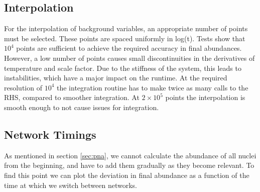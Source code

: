 \subsection{Interpolation}
\label{sec:interpolation}
For the interpolation of background variables, an appropriate number of points must be selected. These points are spaced uniformly in log(t). Tests show that $10^4$ points are sufficient to achieve the required accuracy in final abundances. However, a low number of points causes small discontinuities in the derivatives of temperature and scale factor. Due to the stiffness of the system, this leads to instabilities, which have a major impact on the runtime. At the required resolution of $10^4$ the integration routine has to make twice as many calls to the RHS, compared to smoother integration. At $2\times 10^5$ points the interpolation is smooth enough to not cause issues for integration.


\subsection{Network Timings}
\label{sec:networktiming}
As mentioned in section \ref{sec:pna}, we cannot calculate the abundance of all nuclei from the beginning, and have to add them gradually as they become relevant. To find this point we can plot the deviation in final abundance as a function of the time at which we switch between networks.
